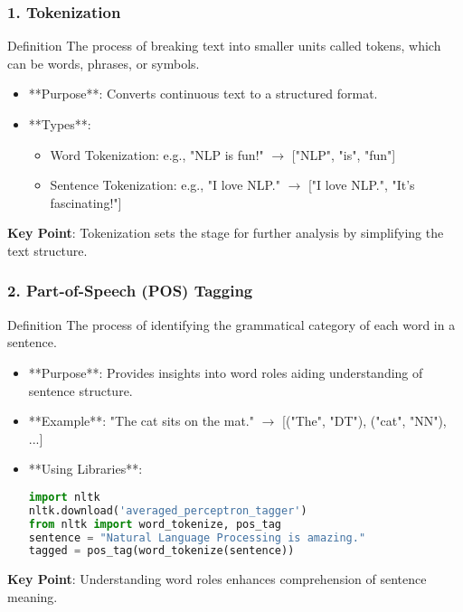 \documentclass[aspectratio=169]{beamer}
\begin{document}
\begin{frame}
    \frametitle{1. Tokenization}
    \begin{block}{Definition}
        The process of breaking text into smaller units called tokens, which can be words, phrases, or symbols.
    \end{block}
    
    \begin{itemize}
        \item **Purpose**: Converts continuous text to a structured format. 
        \item **Types**:
        \begin{itemize}
            \item Word Tokenization: e.g., "NLP is fun!" $\rightarrow$ ["NLP", "is", "fun"]
            \item Sentence Tokenization: e.g., "I love NLP." $\rightarrow$ ["I love NLP.", "It's fascinating!"]
        \end{itemize}
    \end{itemize}
    
    \textbf{Key Point}: Tokenization sets the stage for further analysis by simplifying the text structure.
\end{frame}

\begin{frame}
    \frametitle{2. Part-of-Speech (POS) Tagging}
    \begin{block}{Definition}
        The process of identifying the grammatical category of each word in a sentence.
    \end{block}
    
    \begin{itemize}
        \item **Purpose**: Provides insights into word roles aiding understanding of sentence structure.
        \item **Example**: "The cat sits on the mat." $\rightarrow$ [("The", "DT"), ("cat", "NN"), ...]
        
        \item **Using Libraries**:
        \begin{lstlisting}[language=Python]
import nltk
nltk.download('averaged_perceptron_tagger')
from nltk import word_tokenize, pos_tag
sentence = "Natural Language Processing is amazing."
tagged = pos_tag(word_tokenize(sentence))
        \end{lstlisting}
    \end{itemize}

    \textbf{Key Point}: Understanding word roles enhances comprehension of sentence meaning.
\end{frame}
\end{document}
